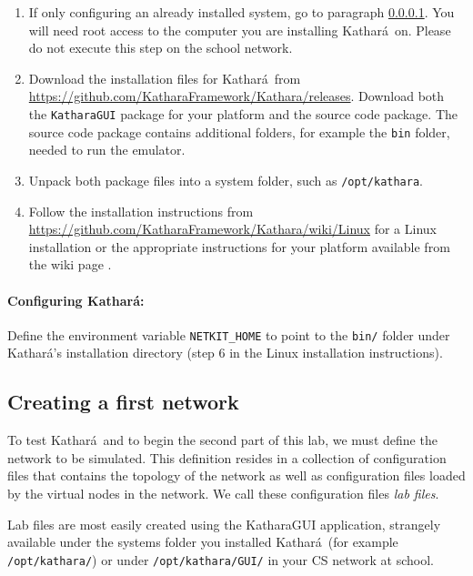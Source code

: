 \documentclass[12pt]{book}
\newcommand{\kathara}{Kathar\'a}
\begin{document}
\begin{enumerate}[(1)]
\item If only configuring an already installed system, go to paragraph
  \ref*{config.se}. You will need root access to the computer you are
  installing \kathara\ on. Please do not execute this step on the
  school network.

\item Download the installation files for \kathara\ from
  \url{https://github.com/KatharaFramework/Kathara/releases}. 
Download both the \verb$KatharaGUI$ package for your platform and the
source code package. The source code package contains additional
folders, for example the \verb$bin$ folder, needed to run the
emulator. 

\item Unpack both package files into a system folder, such as
\verb$/opt/kathara$. 

\item Follow the installation instructions from
\url{https://github.com/KatharaFramework/Kathara/wiki/Linux} for a
Linux installation or the appropriate instructions for your platform
available from the wiki page \cite{kathara-wiki}. 

\end{enumerate}

\paragraph{Configuring \kathara:} \label{config.se}

Define the environment variable \verb$NETKIT_HOME$ to point to the
\verb$bin/$ folder under \kathara's installation directory (step 6 in
the Linux installation instructions).


\subsection{Creating a first network}\label{2nodes.se}

To test \kathara\ and to begin the second part of this lab, we must
define the network to be simulated. This definition resides in a
collection of configuration files that contains the topology of the
network as well as configuration files loaded by the virtual nodes in
the network. We call these configuration files \emph{lab files}.

Lab files are most easily created using the KatharaGUI application,
strangely available under the systems folder you installed \kathara\ 
(for example \verb$/opt/kathara/$) 
or under \verb$/opt/kathara/GUI/$ in your CS network at school. 
\end{document}
